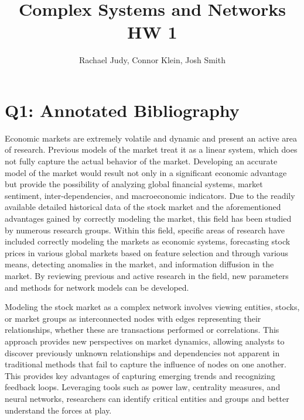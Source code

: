 \documentclass[12pt]{article}
\title{Complex Systems and Networks HW 1}
\author{Rachael Judy, Connor Klein, Josh Smith}
\begin{document}
\pgfplotsset{compat=1.18}
 
\maketitle

\section{Q1: Annotated Bibliography}

Economic markets are extremely volatile and dynamic and present an active area of research. Previous models of the market treat it as a linear system, which does not fully capture the actual behavior of the market. Developing an accurate model of the market would result not only in a significant economic advantage but provide the possibility of analyzing global financial systems, market sentiment, inter-dependencies, and macroeconomic indicators. Due to the readily available detailed historical data of the stock market and the aforementioned advantages gained by correctly modeling the market, this field has been studied by numerous research groups. Within this field, specific areas of research have included correctly modeling the markets as economic systems, forecasting stock prices in various global markets based on feature selection and through various means, detecting anomalies in the market, and information diffusion in the market. By reviewing previous and active research in the field, new parameters and methods for network models can be developed.



Modeling the stock market as a complex network involves viewing entities, stocks, or market groups as interconnected nodes with edges representing their relationships, whether these are transactions performed or correlations. This approach provides new perspectives on market dynamics, allowing analysts to discover previously unknown relationships and dependencies not apparent in traditional methods that fail to capture the influence of nodes on one another. This provides key advantages of capturing emerging trends and recognizing feedback loops. Leveraging tools such as power law, centrality measures, and neural networks, researchers can identify critical entities and groups and better understand the forces at play.
\end{document}
